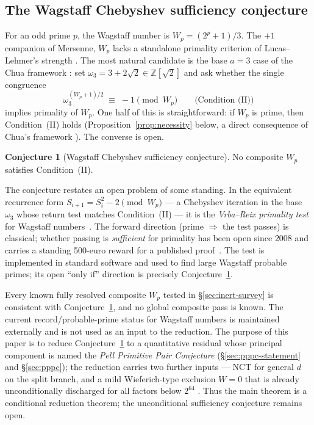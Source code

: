 \documentclass[11pt]{amsart}
\theoremstyle{plain}
\theoremstyle{definition}
\newtheorem{conjecture}[theorem]{Conjecture}
\theoremstyle{remark}
\numberwithin{equation}{section}
\newcommand{\Z}{\mathbb{Z}}
\begin{document}
\subsection{The Wagstaff Chebyshev sufficiency conjecture}

For an odd prime $p$, the Wagstaff number is $W_p = (2^p + 1)/3$. The $+1$ companion of Mersenne, $W_p$ lacks a standalone primality criterion of Lucas--Lehmer's strength \cite{ref:Williams}. The most natural candidate is the base $a = 3$ case of the Chua framework \cite{ref:Chua}: set $\omega_3 = 3 + 2\sqrt{2} \in \Z[\sqrt 2]$ and ask whether the single congruence
\[
  \omega_3^{(W_p + 1)/2} \;\equiv\; -1 \pmod{W_p} \qquad \text{(Condition (II))}
\]
implies primality of $W_p$. One half of this is straightforward: if $W_p$ is prime, then Condition~(II) holds (Proposition~\ref{prop:necessity} below, a direct consequence of Chua's framework \cite{ref:Chua}). The converse is open.

\begin{conjecture}[Wagstaff Chebyshev sufficiency conjecture]\label{conj:suff}
No composite $W_p$ satisfies Condition~(II).
\end{conjecture}

The conjecture restates an open problem of some standing. In the equivalent recurrence form $S_{i+1} = S_i^2 - 2 \pmod{W_p}$ --- a Chebyshev iteration in the base $\omega_3$ whose return test matches Condition~(II) --- it is the \emph{Vrba--Reix primality test} for Wagstaff numbers~\cite{ref:VrbaReix}. The forward direction (prime $\Rightarrow$ the test passes) is classical; whether passing is \emph{sufficient} for primality has been open since 2008 and carries a standing 500-euro reward for a published proof~\cite{ref:VrbaReix}. The test is implemented in standard software and used to find large Wagstaff probable primes; its open ``only if'' direction is precisely Conjecture~\ref{conj:suff}.

Every known fully resolved composite $W_p$ tested in \S\ref{sec:inert-survey} is consistent with Conjecture~\ref{conj:suff}, and no global composite pass is known. The current record/probable-prime status for Wagstaff numbers is maintained externally \cite{ref:PrimePagesWagstaff} and is not used as an input to the reduction. The purpose of this paper is to reduce Conjecture~\ref{conj:suff} to a quantitative residual whose principal component is named the \emph{Pell Primitive Pair Conjecture} (\S\ref{sec:pppc-statement} and \S\ref{sec:pppc}); the reduction carries two further inputs --- NCT for general $d$ on the split branch, and a mild Wieferich-type exclusion $W = 0$ that is already unconditionally discharged for all factors below $2^{64}$ \cite{ref:OEISWieferich}. Thus the main theorem is a conditional reduction theorem; the unconditional sufficiency conjecture remains open.
\end{document}
